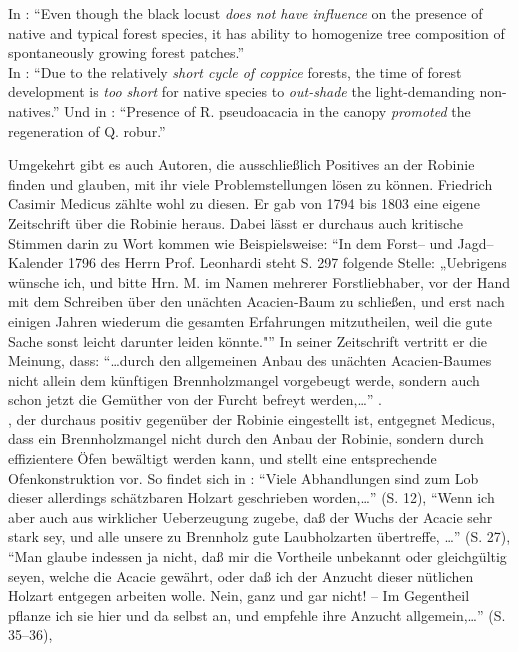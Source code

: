 \documentclass[twocolumn]{scrartcl}
\begin{document}
In \citet{petrasova2013neophyten}:
\enquote{Even though the black locust \emph{does not have influence}
  on the presence of native and typical forest species, it has ability
  to homogenize tree composition of spontaneously growing forest
  patches.}\\
In \citet{radtke2013robinieNiederwald}:
\enquote{Due to the relatively \emph{short cycle of coppice} forests,
  the time of forest development is \emph{too short} for native
  species to \emph{out-shade} the light-demanding non-natives.}
Und in \citet{terwei2013nonNative}:
\enquote{Presence of R. pseudoacacia in the canopy \emph{promoted} the
  regeneration of Q. robur.}

Umgekehrt gibt es auch Autoren, die ausschließlich Positives an der
Robinie finden und glauben, mit ihr viele Problemstellungen lösen zu können.
Friedrich Casimir Medicus zählte wohl zu diesen. Er gab von
1794 bis 1803 eine eigene Zeitschrift über die Robinie heraus. Dabei
lässt er durchaus auch kritische Stimmen darin zu Wort kommen wie
Beispielsweise:
\enquote{In dem Forst-- und Jagd-- Kalender 1796 des Herrn
  Prof. Leonhardi steht S. 297 folgende Stelle: „Uebrigens wünsche
  ich, und bitte Hrn. M. im Namen mehrerer Forstliebhaber, vor der
  Hand mit dem Schreiben über den unächten Acacien-Baum zu schließen,
  und erst nach einigen Jahren wiederum die gesamten Erfahrungen
  mitzutheilen, weil die gute Sache sonst leicht darunter leiden
  könnte."} \citep[Bd. 2, Nr. 2, S. 3]{medicus1794ffRobinie}
In seiner Zeitschrift vertritt er die Meinung, dass:
\enquote{\dots durch den allgemeinen Anbau des unächten Acacien-Baumes
  nicht allein dem künftigen Brennholzmangel vorgebeugt werde, sondern
  auch schon jetzt die Gemüther von der Furcht befreyt werden,\dots}
\citep[Bd. 1, Nr. 3, S. 186]{medicus1794ffRobinie}.\\
\citet{hartig1798robinie}, der durchaus positiv gegenüber der Robinie
eingestellt ist, entgegnet Medicus, dass ein Brennholzmangel nicht durch den
Anbau der Robinie, sondern durch effizientere Öfen bewältigt werden kann,
und stellt eine entsprechende Ofenkonstruktion vor.
So findet sich in \citet{hartig1798robinie}:
\enquote{Viele Abhandlungen sind zum Lob dieser allerdings schätzbaren
  Holzart geschrieben worden,\dots} (S. 12),
\enquote{Wenn ich aber auch aus wirklicher Ueberzeugung zugebe, daß
  der Wuchs der Acacie sehr stark sey, und alle unsere zu Brennholz
  gute Laubholzarten übertreffe, \dots} (S. 27),
\enquote{Man glaube indessen ja nicht, daß mir die Vortheile unbekannt
  oder gleichgültig seyen, welche die Acacie gewährt, oder daß ich der
  Anzucht dieser nütlichen Holzart entgegen arbeiten wolle.  Nein,
  ganz und gar nicht! -- Im Gegentheil pflanze ich sie hier und da
  selbst an, und empfehle ihre Anzucht allgemein,\dots} (S. 35--36),
\end{document}
